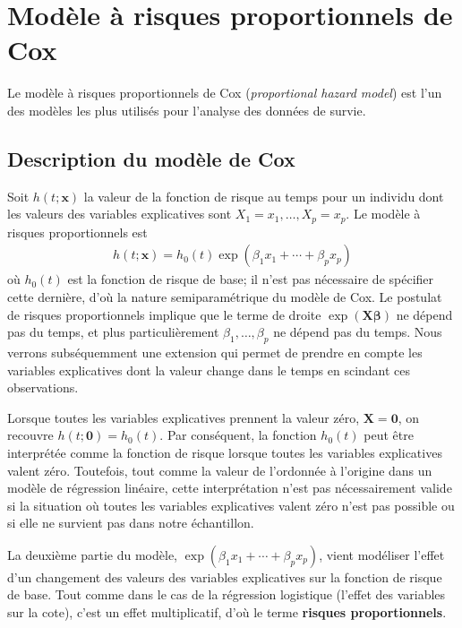 \documentclass[
  11pt,
  letterpaper,
]{scrbook}
\theoremstyle{definition}
\theoremstyle{remark}
\begin{document}
\hypertarget{moduxe8le-uxe0-risques-proportionnels-de-cox}{%
\section{Modèle à risques proportionnels de
Cox}\label{moduxe8le-uxe0-risques-proportionnels-de-cox}}

Le modèle à risques proportionnels de Cox (\emph{proportional hazard
model}) est l'un des modèles les plus utilisés pour l'analyse des
données de survie.

\hypertarget{description-du-moduxe8le-de-cox}{%
\subsection{Description du modèle de
Cox}\label{description-du-moduxe8le-de-cox}}

Soit \(h(t; \boldsymbol{x})\) la valeur de la fonction de risque au
temps pour un individu dont les valeurs des variables explicatives sont
\(X_1=x_1, \ldots, X_p=x_p\). Le modèle à risques proportionnels est
\begin{align*}
h(t; \boldsymbol{x}) = h_0(t)\exp(\beta_1x_1 + \cdots + \beta_p x_p)
\end{align*} où \(h_0(t)\) est la fonction de risque de base; il n'est
pas nécessaire de spécifier cette dernière, d'où la nature
semiparamétrique du modèle de Cox. Le postulat de risques proportionnels
implique que le terme de droite \(\exp(\mathbf{X}\boldsymbol{\beta})\)
ne dépend pas du temps, et plus particulièrement
\(\beta_1, \ldots, \beta_p\) ne dépend pas du temps. Nous verrons
subséquemment une extension qui permet de prendre en compte les
variables explicatives dont la valeur change dans le temps en scindant
ces observations.

Lorsque toutes les variables explicatives prennent la valeur zéro,
\(\boldsymbol{X}=\boldsymbol{0}\), on recouvre
\(h(t; \boldsymbol{0})= h_0(t)\). Par conséquent, la fonction \(h_0(t)\)
peut être interprétée comme la fonction de risque lorsque toutes les
variables explicatives valent zéro. Toutefois, tout comme la valeur de
l'ordonnée à l'origine dans un modèle de régression linéaire, cette
interprétation n'est pas nécessairement valide si la situation où toutes
les variables explicatives valent zéro n'est pas possible ou si elle ne
survient pas dans notre échantillon.

La deuxième partie du modèle,
\(\exp(\beta_1x_1 + \cdots + \beta_p x_p)\), vient modéliser l'effet
d'un changement des valeurs des variables explicatives sur la fonction
de risque de base. Tout comme dans le cas de la régression logistique
(l'effet des variables sur la cote), c'est un effet multiplicatif, d'où
le terme \textbf{risques proportionnels}.
\end{document}
